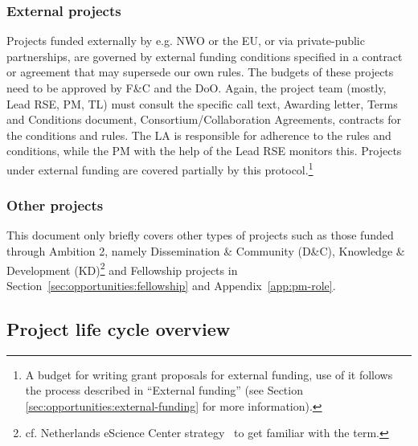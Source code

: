 \documentclass[11pt]{article}
\begin{document}
\subsubsection{External projects}
Projects funded externally by e.g. NWO or the EU, or via private-public partnerships, are governed by external funding
conditions specified in a contract or agreement that may supersede our own rules. The budgets of these projects need to
be approved by F\&C and the DoO. Again, the project team (mostly, Lead RSE, PM, TL) must consult the specific call
text, Awarding letter, Terms and Conditions document, Consortium/Collaboration Agreements, contracts for the conditions
and rules. The LA is responsible for adherence to the rules and conditions, while the PM with the help of the Lead RSE
monitors this. Projects under external funding are covered partially by this protocol.\footnote{A budget for writing
grant proposals for external funding, use of it follows the process described in “External funding” (see Section
\ref{sec:opportunities:external-funding} for more information).}

\subsubsection{Other projects}
This document only briefly covers other types of projects such as those funded through Ambition 2, namely Dissemination
\& Community (D\&C), Knowledge \& Development (KD)\footnote{cf. Netherlands eScience Center strategy~\cite{nlesc-strategy} to get familiar with the term.} and Fellowship projects in 
Section~\ref{sec:opportunities:fellowship} and Appendix~\ref{app:pm-role}.

\clearpage
\subsection{Project life cycle overview}
\label{sec:scope:lifecycle}
\end{document}

